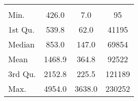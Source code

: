 \begin{tabular}{lS[table-format=5.1]S[table-format=5.1]S[table-format=5.1]}
&  &  &  \\
 Min.    & 426.0 & 7.0 & 95 \\
 1st Qu. & 539.8 & 62.0 & 41195 \\
 Median  & 853.0 & 147.0 & 69854 \\
 Mean    & 1468.9 & 364.8 & 92522 \\
 3rd Qu. & 2152.8 & 225.5 & 121189 \\
 Max.    & 4954.0 & 3638.0 & 230252 \\
\end{tabular}
